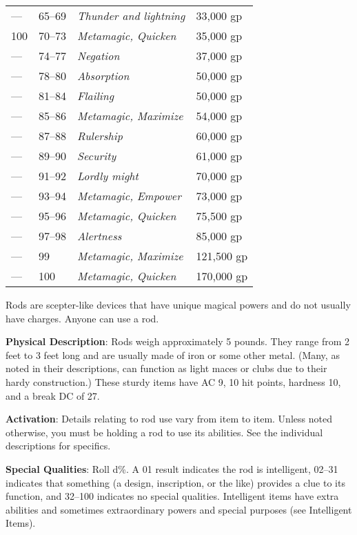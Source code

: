 \begin{table}[]
\begin{tabularx}{\linewidth}{llXl}
 --- & 65--69 & \textit{Thunder and lightning} & 33,000 gp \\
 100 & 70--73 & \textit{Metamagic, Quicken} & 35,000 gp \\
 --- & 74--77 & \textit{Negation} & 37,000 gp \\
 --- & 78--80 & \textit{Absorption} & 50,000 gp \\
 --- & 81--84 & \textit{Flailing} & 50,000 gp \\
 --- & 85--86 & \textit{Metamagic, Maximize} & 54,000 gp \\
 --- & 87--88 & \textit{Rulership} & 60,000 gp \\
 --- & 89--90 & \textit{Security} & 61,000 gp \\
 --- & 91--92 & \textit{Lordly might} & 70,000 gp \\
 --- & 93--94 & \textit{Metamagic, Empower} & 73,000 gp \\
 --- & 95--96 & \textit{Metamagic, Quicken} & 75,500 gp \\
 --- & 97--98 & \textit{Alertness} & 85,000 gp \\
 --- & 99 & \textit{Metamagic, Maximize} & 121,500 gp \\
 --- & 100 & \textit{Metamagic, Quicken} & 170,000 gp\\
\end{tabularx}
\end{table}
				
Rods are scepter-like devices that have unique magical powers and do not usually have charges. Anyone can use a rod.
				
\textbf{Physical Description}: Rods weigh approximately 5 pounds. They range from 2 feet to 3 feet long and are usually made of iron or some other metal. (Many, as noted in their descriptions, can function as light maces or clubs due to their hardy construction.) These sturdy items have AC 9, 10 hit points, hardness 10, and a break DC of 27.
				
\textbf{Activation}: Details relating to rod use vary from item to item. Unless noted otherwise, you must be holding a rod to use its abilities. See the individual descriptions for specifics.
				
\textbf{Special Qualities}: Roll d\%. A 01 result indicates the rod is intelligent, 02--31 indicates that something (a design, inscription, or the like) provides a clue to its function, and 32--100 indicates no special qualities. Intelligent items have extra abilities and sometimes extraordinary powers and special purposes (see Intelligent Items).
				
